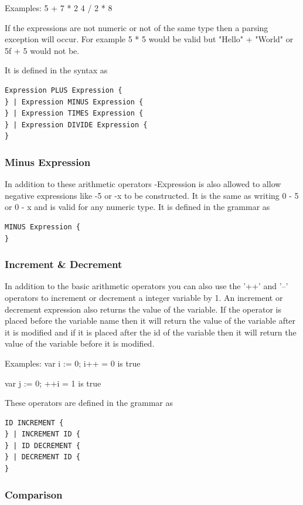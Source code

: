 \documentclass[]{final_report}
\begin{document}
Examples: 
5 + 7 * 2
4 / 2 * 8

If the expressions are not numeric or not of the same type then a parsing exception will occur. For example 5 * 5 would be valid but "Hello" + "World" or 5f + 5 would not be.

It is defined in the syntax as
\begin{verbatim}
Expression PLUS Expression {
} | Expression MINUS Expression {
} | Expression TIMES Expression {
} | Expression DIVIDE Expression {
}
\end{verbatim}

\subsubsection{Minus Expression}

In addition to these arithmetic operators -Expression is also allowed to allow negative expressions like -5 or -x to be constructed. It is the same as writing 0 - 5 or 0 - x and is valid for any numeric type. It is defined in the grammar as 

\begin{verbatim}
MINUS Expression {
}
\end{verbatim}

\subsubsection{Increment \& Decrement}

In addition to the basic arithmetic operators you can also use the '++' and '--' operators to increment or decrement a integer variable by 1. An increment or decrement expression also returns the value of the variable. If the operator is placed before the variable name then it will return the value of the variable after it is modified and if it is placed after the id of the variable then it will return the value of the variable before it is modified.

Examples:
var i := 0;
i++ = 0 is true

var j := 0;
++i = 1 is true

These operators are defined in the grammar as
\begin{verbatim}
ID INCREMENT {
} | INCREMENT ID {
} | ID DECREMENT {
} | DECREMENT ID {
}
\end{verbatim}

\subsubsection{Comparison}
\end{document}
